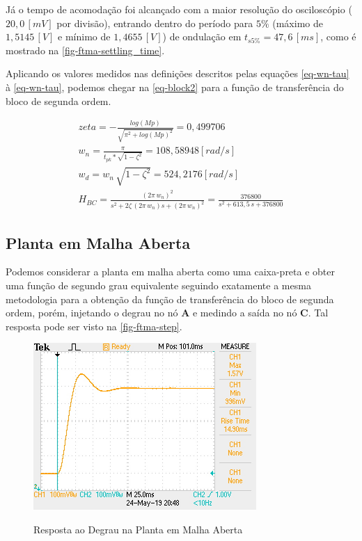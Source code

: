 \documentclass[
	12pt,				%
	article,			%
	openright,			%
	oneside,
	a4paper,			%
	chapter=TITLE,		%
	section=TITLE,		%
	english,			%
	french,				%
	spanish,			%
	brazil,				%
]{abntex2}
\begin{document}
        	Já o tempo de acomodação foi alcançado com a maior resolução do osciloscópio ($20,0\,[mV]$ por divisão), entrando dentro do período para $5\%$ (máximo de $1,5145\,[V]$ e mínimo de $1,4655\,[V]$) de ondulação em $t_{s5\%}=47,6\,[ms]$, como é mostrado na \autoref{fig-ftma-settling_time}.
        
            Aplicando os valores medidos nas definições descritos pelas equações \autoref{eq-wn-tau} à \autoref{eq-wn-tau}, podemos chegar na \autoref{eq-block2} para a função de transferência do bloco de segunda ordem.
        
            \begin{eqnarray}
        	    \label{eq-zeta}
        	    zeta = - \frac{log(Mp)}{\sqrt{\pi^2 + log(Mp)^2}} = 0,499706 \\
        	    \label{eq-wn}
        	    w_n = \frac{\pi}{t_{pk} * \sqrt{1 -\zeta^2}} = 108,58948 [rad/s] \\
        	    \label{eq-wd}
        	    w_d = w_n\,\sqrt{1 -\zeta^2} = 524,2176 [rad/s] \\
        	    \label{eq-block2}
        	    H_{BC} = \frac{(2\pi\,w_n)^2}{s^2 +2\zeta\,(2\pi\,w_n)s +(2\pi\,w_n)^2} = \frac{376800}{s^2 +613,5\,s +376800}
        	\end{eqnarray}
    
        \subsection{Planta em Malha Aberta}
        
            Podemos considerar a planta em malha aberta como uma caixa-preta e obter uma função de segundo grau equivalente seguindo exatamente a mesma metodologia para a obtenção da função de transferência do bloco de segunda ordem, porém, injetando o degrau no nó \textbf{A} e medindo a saída no nó \textbf{C}. Tal resposta pode ser visto na \autoref{fig-ftma-step}.
            
            \begin{figure}[htbp]
            	\centering
            	\caption{Resposta ao Degrau na Planta em Malha Aberta}
            	\includegraphics[width=\textwidth,height=240px,keepaspectratio]{imgs/ftma/step_response.JPG}
            	\label{fig-ftma-step}
        	\end{figure}
            
\end{document}
